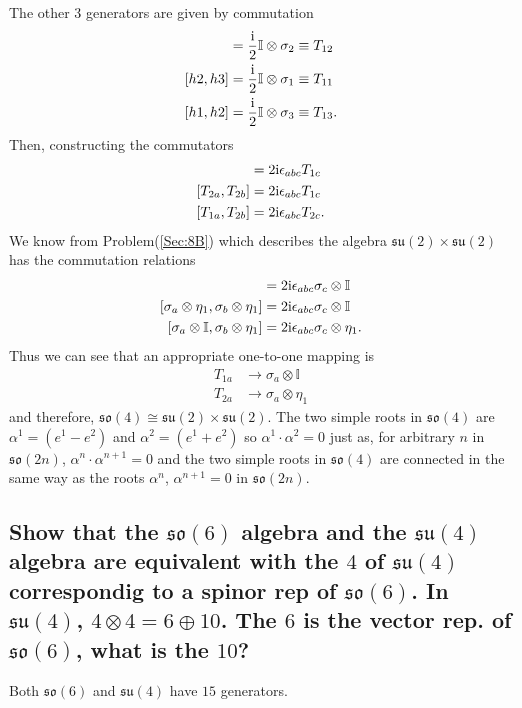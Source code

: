 \documentclass[main.tex]{subfiles}
\begin{document}
The other 3 generators are given by commutation 
\begin{align}
[h1,h3]&=\frac{\img}{2}\mathbb{I}\otimes\sigma_2\equiv T_{12}\\
[h2,h3]&=\frac{\img}{2}\mathbb{I}\otimes\sigma_1\equiv T_{11}\\
[h1,h2]&=\frac{\img}{2}\mathbb{I}\otimes\sigma_3\equiv T_{13}.
\end{align}
 Then, constructing the commutators
\begin{align}
[T_{1a},T_{1b}]&=2\img\epsilon_{abc}T_{1c}\\
[T_{2a},T_{2b}]&=2\img\epsilon_{abc}T_{1c}\\
[T_{1a},T_{2b}]&=2\img\epsilon_{abc}T_{2c}.
\end{align}
We know from Problem(\ref{Sec:8B}) which describes the algebra $\mathfrak{su}(2)\times\mathfrak{su}(2)$ has the commutation relations
\begin{align}
[\sigma_a\otimes\mathbb{I},\sigma_b\otimes\mathbb{I}]&=2\img\epsilon_{abc}\sigma_c\otimes\mathbb{I}\\
[\sigma_a\otimes\eta_1,\sigma_b\otimes\eta_1]&=2\img\epsilon_{abc}\sigma_c\otimes\mathbb{I}\\
[\sigma_a\otimes\mathbb{I},\sigma_b\otimes\eta_1]&=2\img\epsilon_{abc}\sigma_c\otimes\eta_1.
\end{align}
Thus we can see that an appropriate one-to-one mapping is
\begin{align}
T_{1a}&\rightarrow\sigma_a\otimes\mathbb{I}\\
T_{2a}&\rightarrow\sigma_a\otimes\eta_1
\end{align} and therefore, $\mathfrak{so}(4)\cong\mathfrak{su}(2)\times\mathfrak{su}(2)$.
The two simple roots in $\mathfrak{so}(4)$ are $\alpha^1=(e^1-e^2)$ and $\alpha^2=(e^1+e^2)$ so $\alpha^1\cdot\alpha^2=0$ just as, for arbitrary $n$ in $\mathfrak{so}(2n)$, $\alpha^n\cdot\alpha^{n+1}=0$ and the two simple roots in $\mathfrak{so}(4)$ are connected in the same way as the roots $\alpha^n$, $\alpha^{n+1}=0$ in $\mathfrak{so}(2n)$.

\subsection{Show that the $\mathfrak{so}(6)$ algebra and the $\mathfrak{su}(4)$ algebra are equivalent with the $4$ of $\mathfrak{su}(4)$ correspondig to a spinor rep of $\mathfrak{so}(6)$. In $\mathfrak{su}(4)$, $4\otimes4=6\oplus10$. The $6$ is the vector rep. of $\mathfrak{so}(6)$, what is the $10$?}
Both $\mathfrak{so}(6)$ and $\mathfrak{su}(4)$ have $15$ generators. 
\end{document}
